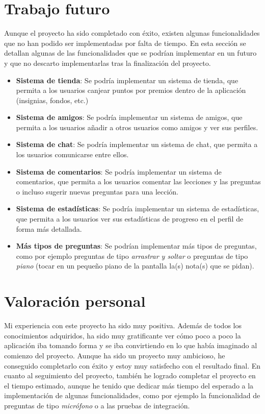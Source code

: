 \section{Trabajo futuro}
\label{sec:trabajo_futuro}
Aunque el proyecto ha sido completado con éxito, existen algunas funcionalidades que no han podido ser implementadas por falta de tiempo. En esta sección se detallan algunas de las funcionalidades que se podrían implementar en un futuro y que no descarto implementarlas tras la finalización del proyecto.
\begin{itemize}
    \item \textbf{Sistema de tienda}: Se podría implementar un sistema de tienda, que permita a los usuarios canjear puntos por premios dentro de la aplicación (insignias, fondos, etc.)
    \item \textbf{Sistema de amigos}: Se podría implementar un sistema de amigos, que permita a los usuarios añadir a otros usuarios como amigos y ver sus perfiles.
    \item \textbf{Sistema de chat}: Se podría implementar un sistema de chat, que permita a los usuarios comunicarse entre ellos.
    \item \textbf{Sistema de comentarios}: Se podría implementar un sistema de comentarios, que permita a los usuarios comentar las lecciones y las preguntas o incluso sugerir nuevas preguntas para una lección.
    \item \textbf{Sistema de estadísticas}: Se podría implementar un sistema de estadísticas, que permita a los usuarios ver sus estadísticas de progreso en el perfil de forma más detallada.
    \item \textbf{Más tipos de preguntas}: Se podrían implementar más tipos de preguntas, como por ejemplo preguntas de tipo \textit{arrastrar y soltar} o preguntas de tipo \textit{piano} (tocar en un pequeño piano de la pantalla la(s) nota(s) que se pidan).
\end{itemize}

\section{Valoración personal}
\label{sec:valoracion_personal}
Mi experiencia con este proyecto ha sido muy positiva. Además de todos los conocimientos adquiridos, ha sido muy gratificante ver cómo poco a poco la aplicación iba tomando forma y se iba convirtiendo en lo que había imaginado al comienzo del proyecto. Aunque ha sido un proyecto muy ambicioso, he conseguido completarlo con éxito y estoy muy satisfecho con el resultado final.
En cuanto al seguimiento del proyecto, también he logrado completar el proyecto en el tiempo estimado, aunque he tenido que dedicar más tiempo del esperado a la implementación de algunas funcionalidades, como por ejemplo la funcionalidad de preguntas de tipo \textit{micrófono} o a las pruebas de integración. 